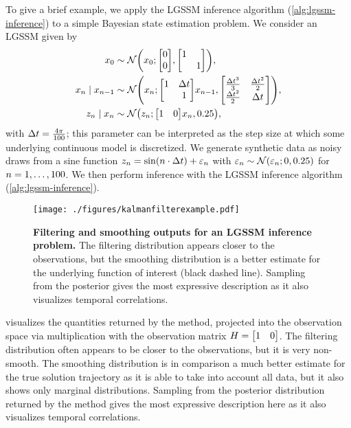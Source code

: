 \documentclass{mimosis}
\begin{document}
To give a brief example, we apply the LGSSM inference algorithm (\ref{alg:lgssm-inference})
to a simple Bayesian state estimation problem.
We consider an LGSSM given by
\begin{subequations}
\begin{align}
\st_0 &\sim \N( \st_0; \mqty[0\\0], \mqty[\dmat{ 1, 1}]), \\
\st_\idxt \mid \st_{\idxt-1} &\sim \N(
  \st_\idxt;
  \mqty[1 & \dt \\ & 1] \st_{\idxt-1},
  \mqty[\frac{\dt^3}{3} & \frac{\dt^2}{2} \\ \frac{\dt^2}{2^{}} & \dt]
), \\
\obs_\idxt \mid \st_\idxt &\sim \N( \obs_\idxt; \mqty[1&0] \st_\idxt, 0.25),
\end{align}
\end{subequations}
with \({\Delta t} = \frac{4\pi}{100}\); this parameter can be interpreted as the step size at which some underlying continuous model is discretized.
We generate synthetic data as noisy draws from a sine function
\(z_n = \sin(n \cdot {\Delta t}) + \varepsilon_n\) with \(\varepsilon_\idxt \sim \N( \varepsilon_\idxt; 0, 0.25)\) for \(n = 1, \dots, 100\).
We then perform inference with the LGSSM inference algorithm (\ref{alg:lgssm-inference}).

\begin{figure}[t]
\centering
\texttt{[image: ./figures/kalmanfilterexample.pdf]}
\caption{\label{fig:kalmanfilterexample}\textbf{Filtering and smoothing outputs for an LGSSM inference problem.} The filtering distribution appears closer to the observations, but the smoothing distribution is a better estimate for the underlying function of interest (black dashed line). Sampling from the posterior gives the most expressive description as it also visualizes temporal correlations.}
\end{figure}

visualizes the quantities returned by the method, projected into the observation space via multiplication with the observation matrix \(H=\mqty[1&0]\).
The filtering distribution often appears to be closer to the observations, but it is very non-smooth.
The smoothing distribution is in comparison a much better estimate for the true solution trajectory as it is able to take into account all data,
but it also shows only marginal distributions.
Sampling from the posterior distribution returned by the method gives the most expressive description here as it also visualizes temporal correlations.
\end{document}
